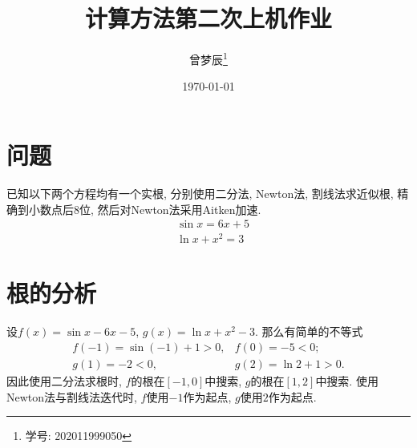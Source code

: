 \documentclass{ctexart}
\title{计算方法第二次上机作业}
\author{曾梦辰\thanks{学号: 202011999050}}
\date{\today}
\begin{document}
\maketitle

\section{问题}
已知以下两个方程均有一个实根, 分别使用二分法, Newton法, 割线法求近似根, 精确到小数点后$8$位, 然后对Newton法采用Aitken加速.
\begin{align*}
    &\sin{x}=6x+5\\
    &\ln{x}+x^2=3
\end{align*}

\section{根的分析}
设$f(x)=\sin{x}-6x-5$, $g(x)=\ln{x}+x^2-3$.
那么有简单的不等式
\[\begin{array}{ll}
    f(-1)=\sin(-1)+1>0, & f(0)=-5<0;\\
    g(1)=-2<0, & g(2)=\ln{2}+1>0.
\end{array}\]
因此使用二分法求根时, $f$的根在$[-1,0]$中搜索, $g$的根在$[1,2]$中搜索.
使用Newton法与割线法迭代时, $f$使用$-1$作为起点, $g$使用$2$作为起点.
\end{document}
